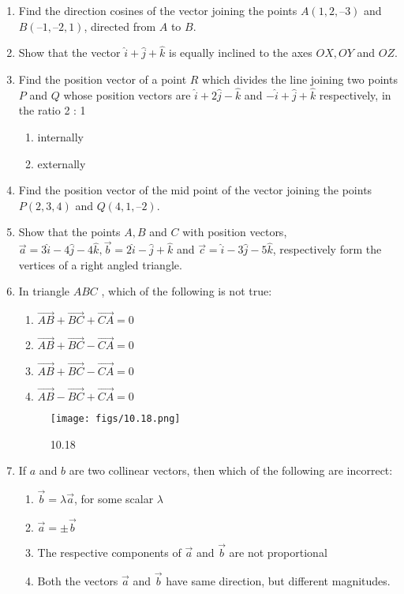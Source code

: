 \documentclass{article}
\theoremstyle{remark}
\begin{document}
\begin{enumerate}
\item Find the direction cosines of the vector joining the points $A(1, 2, –3)$ and $B(–1, –2, 1)$, directed from $A$ to $B$.
\item Show that the vector $\hat{i}+\hat{j}+\hat{k}$ is equally inclined to the axes $OX, OY$ and $OZ$.
\item Find the position vector of a point $R$ which divides the line joining two points $P$ and $Q$ whose position vectors are $\hat{i}+2\hat{j}-\hat{k}$ and $-\hat{i}+\hat{j}+\hat{k}$ respectively, in the ratio 2 : 1
\begin{enumerate}[label=(\roman*)]
    \item  internally
    \item  externally
\end{enumerate}
\item Find the position vector of the mid point of the vector joining the points $P(2, 3, 4)$ and $Q(4, 1, –2)$.
\item Show that the points $A, B$ and $C$ with position vectors, $\overrightarrow{a}=3\hat{i}-4\hat{j}-4\hat{k}, \overrightarrow{b}=2\hat{i}-\hat{j}+\hat{k}$ and $\overrightarrow{c}=\hat{i}-3\hat{j}-5\hat{k}$, respectively form the vertices of a right angled triangle.
\item In triangle $ABC$ , which of the following is not true:
 \begin{enumerate}
         \item $\overrightarrow{AB}+\overrightarrow{BC}+\overrightarrow{CA}=0$
         \item $\overrightarrow{AB}+\overrightarrow{BC}-\overrightarrow{CA}=0$
         \item $\overrightarrow{AB}+\overrightarrow{BC}-\overrightarrow{CA}=0$
         \item $\overrightarrow{AB}-\overrightarrow{BC}+\overrightarrow{CA}=0$
\end{enumerate}
\begin{figure}[!h]
\centering
  \texttt{[image: figs/10.18.png]}
\caption{10.18}
\label{fig:10.18}
\end{figure}
\item If $a$ and $b$ are two collinear vectors, then which of the following are incorrect:
\begin{enumerate}
    \item $\overrightarrow{b}=\lambda \overrightarrow{a}$, for some scalar $\lambda$
    \item $\overrightarrow{a}=\pm \overrightarrow{b}$
    \item The respective components of $\overrightarrow{a}$ and $\overrightarrow{b}$ are not proportional
    \item Both the vectors $\overrightarrow{a}$ and $\overrightarrow{b}$ have same direction, but different magnitudes.
\end{enumerate}
\end{enumerate}
\end{document}
